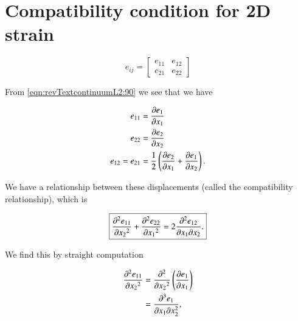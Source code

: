 % 
% 
% 
% 
% 
% 
% 
% 
% 
% 
% 
% 

\section{Compatibility condition for 2D strain}

\begin{equation}\label{eqn:continuumL6:50}
e_{ij} = 
\begin{bmatrix}
e_{11} & e_{12} \\
e_{21} & e_{22}
\end{bmatrix}
\end{equation}

From \ref{eqn:revTextcontinuumL2:90} we see that we have

\begin{align}\label{eqn:continuumL6:70}
e_{11} &= \PD{x_1}{e_1} \\
e_{22} &= \PD{x_2}{e_2} \\
e_{12} = e_{21} &= 
\inv{2} \left( 
\PD{x_1}{e_2}
+ \PD{x_2}{e_1} 
\right).
\end{align}

We have a relationship between these displacements (called the compatibility relationship), which is

\begin{equation}\label{eqn:continuumL6:110}
\boxed{
\PDSq{x_2}{e_{11}} +
\PDSq{x_1}{e_{22}} = 
2
\frac{\partial^2 e_{12}}{\partial x_1 \partial x_2}.
}
\end{equation}

We find this by straight computation

\begin{align*}
\PDSq{x_2}{e_{11}} 
&= 
\PDSq{x_2}{}\left( 
\PD{x_1}{e_1}
\right) \\
&=
\frac{\partial^3 e_1}{\partial x_1 \partial x_2^2},
\end{align*}

